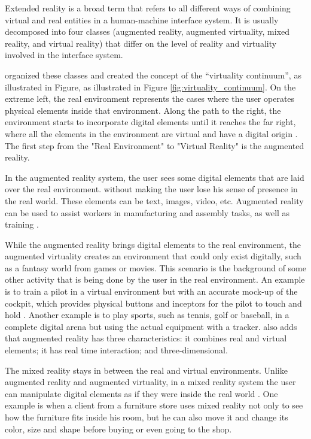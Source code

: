 Extended reality is a broad term that refers to all different ways of combining virtual and real entities in a human-machine interface system. It is usually decomposed into four classes (augmented reality, augmented virtuality, mixed reality, and virtual reality) that differ on the level of reality and virtuality involved in the interface system. 

 organized these classes and created the concept of the “virtuality continuum”, as illustrated in Figure, as illustrated in Figure \ref{fig:virtuality_continuum}. On the extreme left, the real environment represents the cases where the user operates physical elements inside that environment. Along the path to the right, the environment starts to incorporate digital elements until it reaches the far right, where all the elements in the environment are virtual and have a digital origin \cite{nijholt2005virtuality, doolani2020review}. The first step from the "Real Environment" to "Virtual Reality" is the augmented reality.



In the augmented reality system, the user sees some digital elements that are laid over the real environment. without making the user lose his sense of presence in the real world. These elements can be text, images, video, etc. Augmented reality can be used to assist workers in manufacturing and assembly tasks, as well as training \cite{doolani2020review, farrell2018learning, ma2007virtuality}.
    
While the augmented reality brings digital elements to the real environment, the augmented virtuality creates an environment that could only exist digitally, such as a fantasy world from games or movies. This scenario is the background of some other activity that is being done by the user in the real environment. An example is to train a pilot in a virtual environment but with an accurate mock-up of the cockpit, which provides physical buttons and inceptors for the pilot to touch and hold \cite{farshid2018go}. Another example is to play sports, such as tennis, golf or baseball, in a complete digital arena but using the actual equipment with a tracker.  also adds that augmented reality has three characteristics: it combines real and virtual elements; it has real time interaction; and three-dimensional.

The mixed reality stays in between the real and virtual environments. Unlike augmented reality and augmented virtuality, in a mixed reality system the user can manipulate digital elements as if they were inside the real world \cite{doolani2020review}. One example is when a client from a furniture store uses mixed reality not only to see how the furniture fits inside his room, but he can also move it and change its color, size and shape before buying or even going to the shop.
    
